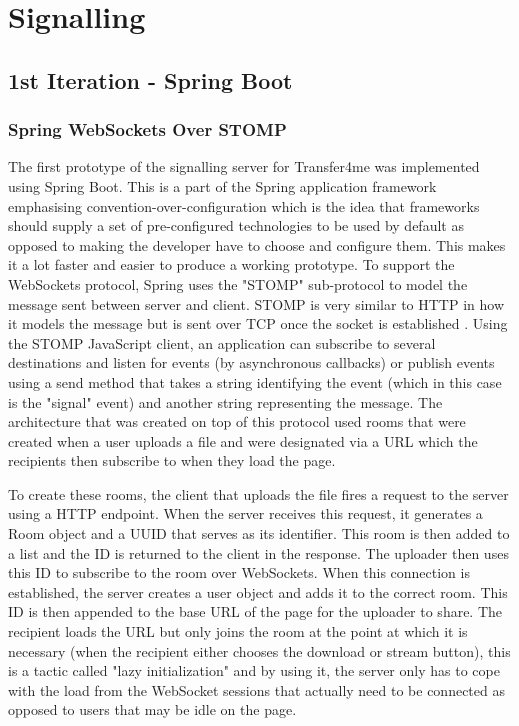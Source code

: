 \documentclass[]{report}
\begin{document}
		\section{Signalling}
			\subsection{1st Iteration - Spring Boot}
				\subsubsection{Spring WebSockets Over STOMP}
				The first prototype of the signalling server for Transfer4me was implemented using Spring Boot. This is a part of the Spring application framework emphasising convention-over-configuration which is the idea that frameworks should supply a set of pre-configured technologies to be used by default as opposed to making the developer have to choose and configure them. This makes it a lot faster and easier to produce a working prototype. To support the WebSockets protocol, Spring uses the "STOMP" sub-protocol to model the message sent between server and client. STOMP is very similar to HTTP in how it models the message but is sent over TCP once the socket is established \cite{STOMP}. Using the STOMP JavaScript client, an application can subscribe to several destinations and listen for events (by asynchronous callbacks) or publish events using a send method that takes a string identifying the event (which in this case is the "signal" event) and another string representing the message. The architecture that was created on top of this protocol used rooms that were created when a user uploads a file and were designated via a URL which the recipients then subscribe to when they load the page.

				To create these rooms, the client that uploads the file fires a request to the server using a HTTP endpoint. When the server receives this request, it generates a Room object and a UUID that serves as its identifier. This room is then added to a list and the ID is returned to the client in the response. The uploader then uses this ID to subscribe to the room over WebSockets. When this connection is established, the server creates a user object and adds it to the correct room. This ID is then appended to the base URL of the page for the uploader to share. The recipient loads the URL but only joins the room at the point at which it is necessary (when the recipient either chooses the download or stream button), this is a tactic called "lazy initialization" and by using it, the server only has to cope with the load from the WebSocket sessions that actually need to be connected as opposed to users that may be idle on the page.
				
\end{document}
